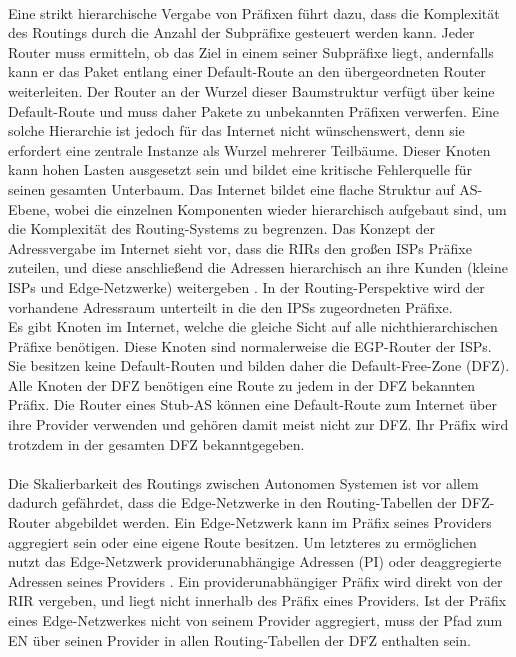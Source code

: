 \paragraph{}
Eine strikt hierarchische Vergabe von Präfixen führt dazu, dass die Komplexität des Routings durch die Anzahl der Subpräfixe gesteuert werden kann. Jeder Router muss ermitteln, ob das Ziel in einem seiner Subpräfixe liegt, andernfalls kann er das Paket entlang einer Default-Route an den übergeordneten Router weiterleiten. Der Router an der Wurzel dieser Baumstruktur verfügt über keine Default-Route und muss daher Pakete zu unbekannten Präfixen verwerfen. Eine solche Hierarchie ist jedoch für das Internet nicht wünschenswert, denn sie erfordert eine zentrale Instanze als Wurzel mehrerer Teilbäume. Dieser Knoten kann hohen Lasten ausgesetzt sein und bildet eine kritische Fehlerquelle für seinen gesamten Unterbaum. Das Internet bildet eine flache Struktur auf AS-Ebene, wobei die einzelnen Komponenten wieder hierarchisch aufgebaut sind, um die Komplexität des Routing-Systems zu begrenzen. Das Konzept der Adressvergabe im Internet sieht vor, dass die RIRs den großen ISPs Präfixe zuteilen, und diese anschließend die Adressen hierarchisch an ihre Kunden (kleine ISPs und Edge-Netzwerke) weitergeben \cite{ripe:ipv4}. In der Routing-Perspektive wird der vorhandene Adressraum unterteilt in die den IPSs zugeordneten Präfixe. \\

Es gibt Knoten im Internet, welche die gleiche Sicht auf alle nichthierarchischen Präfixe benötigen. Diese Knoten sind normalerweise die EGP-Router der ISPs. Sie besitzen keine Default-Routen und bilden daher die Default-Free-Zone (DFZ). Alle Knoten der DFZ benötigen eine Route zu jedem in der DFZ bekannten Präfix. Die Router eines Stub-AS können eine Default-Route zum Internet über ihre Provider verwenden und gehören damit meist nicht zur DFZ. Ihr Präfix wird trotzdem in der gesamten DFZ bekanntgegeben. 

\paragraph{}
Die Skalierbarkeit des Routings zwischen Autonomen Systemen ist vor allem dadurch gefährdet, dass die Edge-Netzwerke in den Routing-Tabellen der DFZ-Router abgebildet werden.
Ein Edge-Netzwerk kann im Präfix seines Providers aggregiert sein oder eine eigene Route besitzen. Um letzteres zu ermöglichen nutzt das Edge-Netzwerk  providerunabhängige Adressen (PI) oder deaggregierte Adressen seines Providers \cite{jen:2008:start}. Ein providerunabhängiger Präfix wird direkt von der RIR vergeben, und liegt nicht innerhalb des Präfix eines Providers. Ist der Präfix eines Edge-Netzwerkes nicht von seinem Provider aggregiert, muss der Pfad zum EN über seinen Provider in allen Routing-Tabellen der DFZ enthalten sein.

